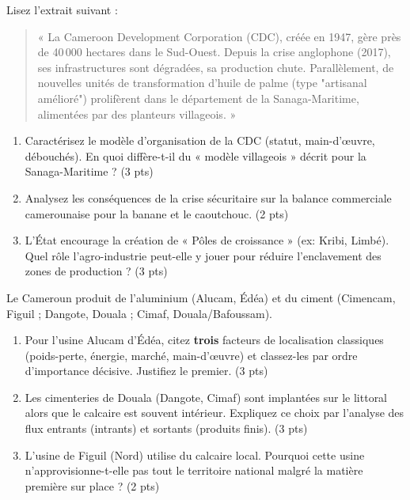 \documentclass[11pt]{article}
\begin{document}
\begin{exercice}
Lisez l'extrait suivant : 
\begin{quote}
« La Cameroon Development Corporation (CDC), créée en 1947, gère près de 40\,000 hectares dans le Sud-Ouest. Depuis la crise anglophone (2017), ses infrastructures sont dégradées, sa production chute. Parallèlement, de nouvelles unités de transformation d'huile de palme (type "artisanal amélioré") prolifèrent dans le département de la Sanaga-Maritime, alimentées par des planteurs villageois. »
\end{quote}

\begin{enumerate}
    \item Caractérisez le modèle d'organisation de la CDC (statut, main-d'œuvre, débouchés). En quoi diffère-t-il du « modèle villageois » décrit pour la Sanaga-Maritime ? (3 pts)
    \item Analysez les conséquences de la crise sécuritaire sur la balance commerciale camerounaise pour la banane et le caoutchouc. (2 pts)
    \item L'État encourage la création de « Pôles de croissance » (ex: Kribi, Limbé). Quel rôle l'agro-industrie peut-elle y jouer pour réduire l'enclavement des zones de production ? (3 pts)
\end{enumerate}
\end{exercice}

\begin{exercice}
Le Cameroun produit de l'aluminium (Alucam, Édéa) et du ciment (Cimencam, Figuil ; Dangote, Douala ; Cimaf, Douala/Bafoussam).

\begin{enumerate}
    \item Pour l'usine Alucam d'Édéa, citez \textbf{trois} facteurs de localisation classiques (poids-perte, énergie, marché, main-d'œuvre) et classez-les par ordre d'importance décisive. Justifiez le premier. (3 pts)
    \item Les cimenteries de Douala (Dangote, Cimaf) sont implantées sur le littoral alors que le calcaire est souvent intérieur. Expliquez ce choix par l'analyse des flux entrants (intrants) et sortants (produits finis). (3 pts)
    \item L'usine de Figuil (Nord) utilise du calcaire local. Pourquoi cette usine n'approvisionne-t-elle pas tout le territoire national malgré la matière première sur place ? (2 pts)
\end{enumerate}
\end{exercice}
\end{document}
